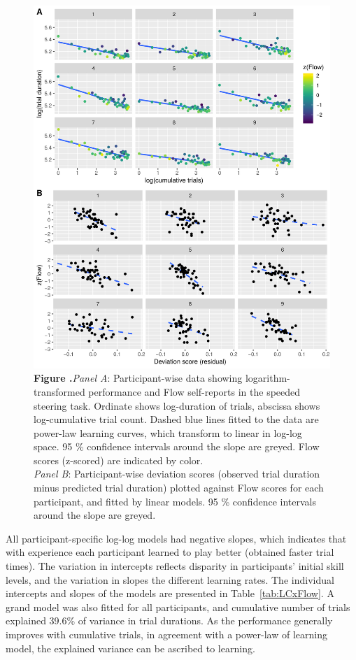 \documentclass{frontierstyle/frontiersSCNS}
\begin{document}
\begin{figure}[!p]
	\centering
	\includegraphics[width=\linewidth]{3_cogcar_main}
	\textbf{\label{fig:flowVperf} Figure .}{{\it Panel A}: Participant-wise data showing logarithm-transformed performance and Flow self-reports in the speeded steering task. Ordinate shows log-duration of trials, abscissa shows log-cumulative trial count. Dashed blue lines fitted to the data are power-law learning curves, which transform to linear in log-log space. 95 \% confidence intervals around the slope are greyed. Flow scores (z-scored) are indicated by color.\\
	{\it Panel B}: Participant-wise deviation scores (observed trial duration minus predicted trial duration) plotted against Flow scores for each participant, and fitted by linear models. 95 \% confidence intervals around the slope are greyed.}
\end{figure}

All participant-specific log-log models had negative slopes, which indicates that with experience each participant learned to play better (obtained faster trial times). The variation in intercepts reflects disparity in participants' initial skill levels, and the variation in slopes the different learning rates. The individual intercepts and slopes of the models are presented in Table~\ref{tab:LCxFlow}. A grand model was also fitted for all participants, and cumulative number of trials explained 39.6\% of variance in trial durations. As the performance generally improves with cumulative trials, in agreement with a power-law of learning model, the explained variance can be ascribed to learning.
\end{document}
